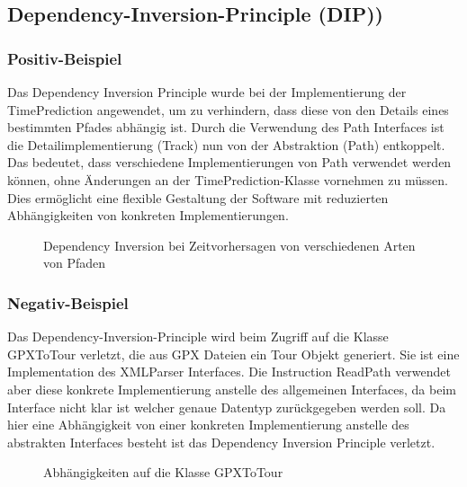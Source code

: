 \subsection{Dependency-Inversion-Principle (DIP))}

\subsubsection{Positiv-Beispiel}

Das Dependency Inversion Principle wurde bei der Implementierung der TimePrediction angewendet, um zu verhindern, dass diese von den Details eines bestimmten Pfades abhängig ist. Durch die Verwendung des Path Interfaces ist die Detailimplementierung (Track) nun von der Abstraktion (Path) entkoppelt. Das bedeutet, dass verschiedene Implementierungen von Path verwendet werden können, ohne Änderungen an der TimePrediction-Klasse vornehmen zu müssen. Dies ermöglicht eine flexible Gestaltung der Software mit reduzierten Abhängigkeiten von konkreten Implementierungen.

\begin{figure}[H]
  \centering
  
  \caption{Dependency Inversion bei Zeitvorhersagen von verschiedenen Arten von Pfaden}
\end{figure}

\subsubsection{Negativ-Beispiel}

Das Dependency-Inversion-Principle wird beim Zugriff auf die Klasse GPXToTour verletzt, die aus GPX Dateien ein Tour Objekt generiert.
Sie ist eine Implementation des XMLParser Interfaces. Die Instruction ReadPath verwendet aber diese konkrete Implementierung anstelle des allgemeinen Interfaces, da beim Interface nicht klar ist welcher genaue Datentyp zurückgegeben werden soll. 
Da hier eine Abhängigkeit von einer konkreten Implementierung anstelle des abstrakten Interfaces besteht ist das Dependency Inversion Principle verletzt.

\begin{figure}[H]
  \centering
  
  \caption{Abhängigkeiten auf die Klasse GPXToTour}
\end{figure}


